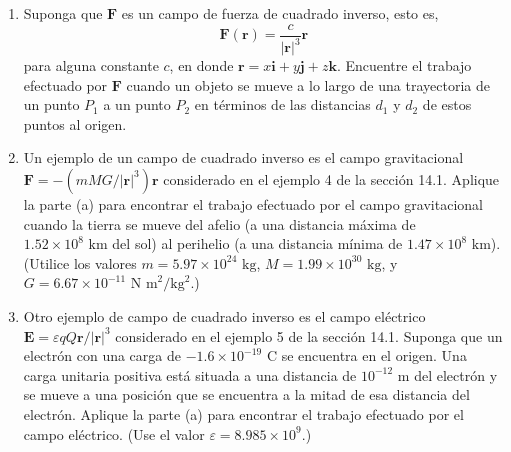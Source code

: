 \item
    \begin{enumerate}
        \item[(a)] Suponga que $\mathbf{F}$ es un campo de fuerza de cuadrado inverso, esto es,
        \[ \mathbf{F}(\mathbf{r}) = \frac{c}{|\mathbf{r}|^3} \mathbf{r} \]
        para alguna constante $c$, en donde $\mathbf{r} = x\mathbf{i} + y\mathbf{j} + z\mathbf{k}$. Encuentre el trabajo efectuado por $\mathbf{F}$ cuando un objeto se mueve a lo largo de una trayectoria de un punto $P_1$ a un punto $P_2$ en términos de las distancias $d_1$ y $d_2$ de estos puntos al origen.
        \item[(b)] Un ejemplo de un campo de cuadrado inverso es el campo gravitacional $\mathbf{F} = -(mM G / |\mathbf{r}|^3) \mathbf{r}$ considerado en el ejemplo 4 de la sección 14.1. Aplique la parte (a) para encontrar el trabajo efectuado por el campo gravitacional cuando la tierra se mueve del afelio (a una distancia máxima de $1.52 \times 10^8 \text{ km}$ del sol) al perihelio (a una distancia mínima de $1.47 \times 10^8 \text{ km}$). (Utilice los valores $m = 5.97 \times 10^{24} \text{ kg}$, $M = 1.99 \times 10^{30} \text{ kg}$, y $G = 6.67 \times 10^{-11} \text{ N m}^2 / \text{kg}^2$.)
        \item[(c)] Otro ejemplo de campo de cuadrado inverso es el campo eléctrico $\mathbf{E} = \varepsilon q Q \mathbf{r} / |\mathbf{r}|^3$ considerado en el ejemplo 5 de la sección 14.1. Suponga que un electrón con una carga de $-1.6 \times 10^{-19} \text{ C}$ se encuentra en el origen. Una carga unitaria positiva está situada a una distancia de $10^{-12} \text{ m}$ del electrón y se mueve a una posición que se encuentra a la mitad de esa distancia del electrón. Aplique la parte (a) para encontrar el trabajo efectuado por el campo eléctrico. (Use el valor $\varepsilon = 8.985 \times 10^9$.)
    \end{enumerate}
